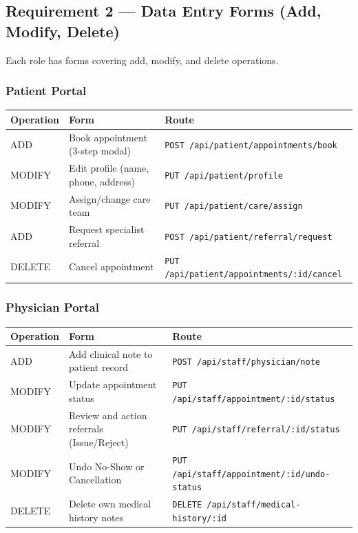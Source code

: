 \documentclass[12pt, letterpaper]{article}
\begin{document}
\subsection{Requirement 2 — Data Entry Forms (Add, Modify, Delete)}

\begin{infoblue}
Each role has forms covering add, modify, and delete operations.
\end{infoblue}

\subsubsection{Patient Portal}
\begin{center}
\begin{tabular}{lll}
  \toprule
  \textbf{Operation} & \textbf{Form} & \textbf{Route} \\
  \midrule
  ADD    & Book appointment (3-step modal)    & \texttt{POST /api/patient/appointments/book} \\
  MODIFY & Edit profile (name, phone, address) & \texttt{PUT /api/patient/profile} \\
  MODIFY & Assign/change care team            & \texttt{PUT /api/patient/care/assign} \\
  ADD    & Request specialist referral        & \texttt{POST /api/patient/referral/request} \\
  DELETE & Cancel appointment                 & \texttt{PUT /api/patient/appointments/:id/cancel} \\
  \bottomrule
\end{tabular}
\end{center}

\subsubsection{Physician Portal}
\begin{center}
\begin{tabular}{lll}
  \toprule
  \textbf{Operation} & \textbf{Form} & \textbf{Route} \\
  \midrule
  ADD    & Add clinical note to patient record   & \texttt{POST /api/staff/physician/note} \\
  MODIFY & Update appointment status             & \texttt{PUT /api/staff/appointment/:id/status} \\
  MODIFY & Review and action referrals (Issue/Reject) & \texttt{PUT /api/staff/referral/:id/status} \\
  MODIFY & Undo No-Show or Cancellation          & \texttt{PUT /api/staff/appointment/:id/undo-status} \\
  DELETE & Delete own medical history notes      & \texttt{DELETE /api/staff/medical-history/:id} \\
  \bottomrule
\end{tabular}
\end{center}
\end{document}
